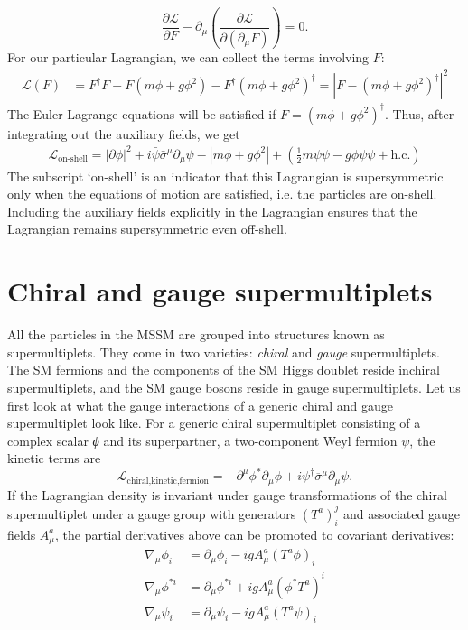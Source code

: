\[\frac{\partial\mathcal{L}}{\partial F}-\partial_\mu\left(\frac{\partial\mathcal{L}}{\partial(\partial_\mu F)}\right) = 0.\]
For our particular Lagrangian, we can collect the terms involving $F$:
\begin{align*}
\mathcal{L}(F) &= F^\dagger F - F(m\phi+g\phi^2) - F^\dagger(m\phi+g\phi^2)^\dagger= |F-(m\phi+g\phi^2)^\dagger|^2
\end{align*}
The Euler-Lagrange equations will be satisfied if $F = (m\phi+g\phi^2)^\dagger$. Thus, after integrating out the auxiliary fields, we get
\begin{align*}
  \mathcal{L}_\text{on-shell} = |\partial\phi|^2+ i\bar{\psi}\bar{\sigma}^\mu\partial_\mu\psi-|m\phi+g\phi^2|+\left(\frac{1}{2}m\psi\psi-g\phi\psi\psi + \text{h.c.}\right)
\end{align*}
The subscript `on-shell' is an indicator that this Lagrangian is supersymmetric only when the equations of motion are satisfied, i.e. the particles are on-shell. Including the auxiliary fields explicitly in the Lagrangian ensures that the Lagrangian remains supersymmetric even off-shell.

\section{Chiral and gauge supermultiplets}
All the particles in the MSSM are grouped into structures known as supermultiplets. They come in two varieties: \emph{chiral} and \emph{gauge} supermultiplets. The SM fermions and the components of the SM Higgs doublet reside inchiral supermultiplets, and the SM gauge bosons reside in gauge supermultiplets. Let us first look at what the gauge interactions of a generic chiral and gauge supermultiplet look like.
For a generic chiral supermultiplet consisting of a complex scalar \emph{ϕ} and its superpartner, a two-component Weyl fermion $\psi$, the kinetic terms are 
\[\mathcal{L}_{\text{chiral,kinetic,fermion}} = -\partial^\mu\phi^*\partial_\mu\phi + i\psi^{\dagger}\overline{\sigma}^\mu\partial_\mu\psi.\]
If the Lagrangian density is invariant under gauge transformations of the chiral supermultiplet under a gauge group with generators $(T^a)_i^j$ and associated gauge fields $A_\mu^a$, the partial derivatives above can be promoted to covariant derivatives:
\begin{align}
  \nabla_\mu\phi_i &= \partial_\mu\phi_i - igA_\mu^a(T^a\phi)_i\label{eq:phi1}\\
  \nabla_\mu\phi^{*i} &= \partial_\mu\phi^{*i} + igA_\mu^a(\phi^*T^a)^{i}\label{eq:phi2}\\
  \nabla_\mu\psi_i &= \partial_\mu\psi_i - igA_\mu^a(T^a\psi)_i\label{eq:psi}
\end{align}

